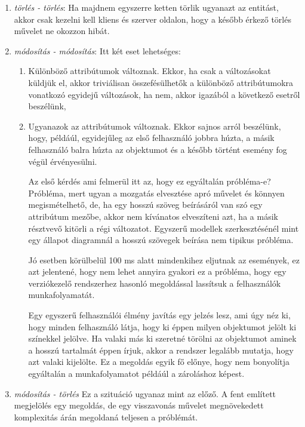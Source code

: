 \begin{enumerate}
\item { \emph{törlés - törlés}}: Ha majdnem egyszerre ketten törlik ugyanazt az entitást, akkor csak kezelni kell kliens és szerver oldalon, hogy a később érkező törlés művelet ne okozzon hibát. 
\item { \emph{módosítás - módosítás}}: Itt két eset lehetséges:
\begin{enumerate}
\item Különböző attribútumok változnak. Ekkor, ha csak a változásokat küldjük el, akkor triviálisan összefésülhetők a különböző attribútumokra vonatkozó egyidejű változások, ha nem, akkor igazából a következő esetről beszélünk,
\item Ugyanazok az attribútumok változnak. Ekkor sajnos arról beszélünk, hogy, példáúl, egyidejűleg az első felhasználó jobbra 
húzta, a másik felhasználó balra húzta az objektumot és a később történt esemény fog végül érvényesülni. 

Az első kérdés ami felmerül itt az, hogy ez egyáltalán próbléma-e? Próbléma, mert ugyan a mozgatás elvesztése apró művelet és könnyen megismételhető, de, ha egy hosszú szöveg beírásáról van szó egy attribútum mezőbe, akkor nem kívánatos elveszíteni azt, ha a másik résztvevő kitörli a régi változatot. Egyszerű modellek szerkesztésénél mint egy állapot diagramnál a hosszú szövegek beírása nem tipikus próbléma. 

Jó esetben körülbelül 100 ms alatt mindenkihez eljutnak az események, ez azt jelentené, hogy nem lehet annyira gyakori ez a próbléma, hogy egy verziókezelő rendszerhez hasonló megoldással lassítsuk a felhasználók munkafolyamatát.

Egy egyszerű felhasználói élmény javítás egy jelzés lesz, ami úgy néz ki, hogy minden felhasználó látja, hogy ki éppen milyen objektumot jelölt ki színekkel jelölve. Ha valaki más ki szeretné törölni az objektumot aminek a hosszú tartalmát éppen írjuk, akkor a rendszer legalább mutatja, hogy azt valaki kijelölte. Ez a megoldás egyik fő előnye, hogy nem bonyolítja egyáltalán a munkafolyamatot példáúl a zároláshoz képest.

\end{enumerate}
\item { \emph{módosítás - törlés }} Ez a szituáció ugyanaz mint az előző. A fent említett megjelölés egy megoldás, de egy visszavonás művelet megnövekedett komplexitás árán megoldaná teljesen a próblémát.
\end{enumerate}

